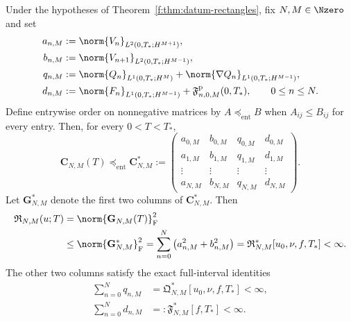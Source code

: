 \begin{proposition}
\label{f:prop:datum-terminal-matrix-consequence}
Under the hypotheses of Theorem~\ref{f:thm:datum-rectangles}, fix
\(N,M\in\Nzero\) and set
\begin{align}
 a_{n,M}
 &:=\norm{V_n}_{L^2(0,T_*;H^{M+1})},\notag\\
 b_{n,M}
 &:=\norm{V_{n+1}}_{L^2(0,T_*;H^{M-1})},\notag\\
 q_{n,M}
 &:=\norm{Q_n}_{L^1(0,T_*;H^M)}
   +\norm{\nabla Q_n}_{L^1(0,T_*;H^{M-1})},\notag\\
 d_{n,M}
 &:=\norm{F_n}_{L^1(0,T_*;H^{M-1})}
   +\mathfrak F^{\rm p}_{n,0,M}(0,T_*),
 \qquad 0\le n\le N.
 \label{f:eq:datum-terminal-coordinate-norms}
\end{align}
Define entrywise order on nonnegative matrices by
\(A\preceq_{\mathrm{ent}}B\) when \(A_{ij}\le B_{ij}\) for every entry.
Then, for every \(0<T<T_*\),
\begin{equation}
 \mathbf C_{N,M}(T)
 \preceq_{\mathrm{ent}}
 \mathbf C_{N,M}^*
 :=
 \begin{pmatrix}
  a_{0,M}&b_{0,M}&q_{0,M}&d_{0,M}\\
  a_{1,M}&b_{1,M}&q_{1,M}&d_{1,M}\\
  \vdots&\vdots&\vdots&\vdots\\
  a_{N,M}&b_{N,M}&q_{N,M}&d_{N,M}
 \end{pmatrix}.
 \label{f:eq:datum-terminal-matrix-bound}
\end{equation}
Let \(\mathbf G_{N,M}^*\) denote the first two columns of
\(\mathbf C_{N,M}^*\).  Then
\begin{align}
 \mathfrak R_{N,M}(u;T)
 &=\norm{\mathbf G_{N,M}(T)}_{\mathrm F}^2\notag\\
 &\le\norm{\mathbf G_{N,M}^*}_{\mathrm F}^2
 =\sum_{n=0}^{N}\left(a_{n,M}^2+b_{n,M}^2\right)
 =\mathfrak R_{N,M}^*[u_0,\nu,f,T_*]<\infty.
 \label{f:eq:datum-terminal-finite-sum}
\end{align}
The other two columns satisfy the exact full-interval identities
\begin{align}
 \sum_{n=0}^Nq_{n,M}
 &=\mathfrak Q_{N,M}^*[u_0,\nu,f,T_*]<\infty,
 \label{f:eq:datum-terminal-pressure-column}\\
 \sum_{n=0}^Nd_{n,M}
 &=:\mathfrak F_{N,M}^*[f,T_*]<\infty.
 \label{f:eq:datum-terminal-force-column}
\end{align}
\end{proposition}

